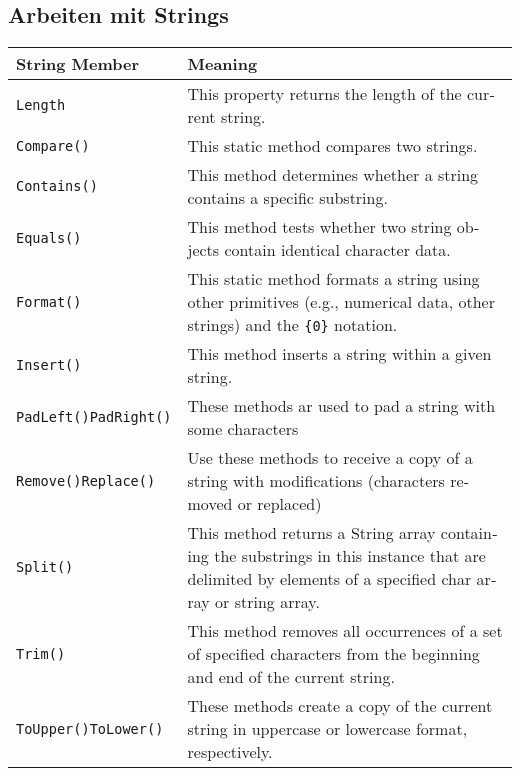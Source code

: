 \subsection{Arbeiten mit Strings}
\begin{otherlanguage}{english}
\begin{longtable}{L{.2} L{.7}}
String Member & Meaning\\\hline
\lstinline$Length$ & This property returns the length of the current string.\\
\lstinline$Compare()$ & This static method compares two strings.\\
\lstinline$Contains()$ & This method determines whether a string contains a specific substring.\\
\lstinline$Equals()$ & This method tests whether two string objects contain identical character data.\\
\lstinline$Format()$ & This static method formats a string using other primitives (e.g., numerical data, other strings) and the \lstinline${0}$ notation.\\
\lstinline$Insert()$ & This method inserts a string within a given string.\\
\lstinline$PadLeft()$\newline \lstinline$PadRight()$ & These methods ar used to pad a string with some characters\\
\lstinline$Remove()$\newline \lstinline$Replace()$ & Use these methods to receive a copy of a string with modifications (characters removed or replaced)\\
\lstinline$Split()$ & This method returns a String array containing the substrings in this instance that are delimited by elements of a specified char array or string array.\\
\lstinline$Trim()$ & This method removes all occurrences of a set of specified characters from the beginning and end of the current string.\\
\lstinline$ToUpper()$\newline \lstinline$ToLower()$ & These methods create a copy of the current string in uppercase or lowercase format, respectively.
\end{longtable}
\end{otherlanguage}


